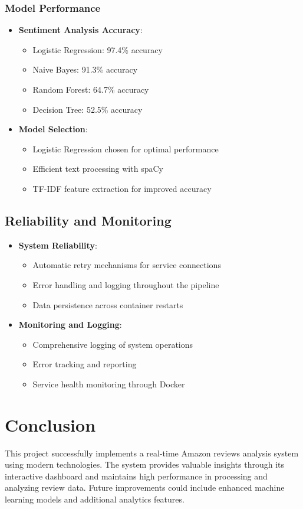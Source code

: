 \documentclass[11pt,a4paper,twocolumn]{article}
\begin{document}
\subsubsection{Model Performance}
\begin{itemize}
    \item \textbf{Sentiment Analysis Accuracy}:
    \begin{itemize}
        \item Logistic Regression: 97.4\% accuracy
        \item Naive Bayes: 91.3\% accuracy
        \item Random Forest: 64.7\% accuracy
        \item Decision Tree: 52.5\% accuracy
    \end{itemize}
    
    \item \textbf{Model Selection}:
    \begin{itemize}
        \item Logistic Regression chosen for optimal performance
        \item Efficient text processing with spaCy
        \item TF-IDF feature extraction for improved accuracy
    \end{itemize}
\end{itemize}

\subsection{Reliability and Monitoring}
\begin{itemize}
    \item \textbf{System Reliability}:
    \begin{itemize}
        \item Automatic retry mechanisms for service connections
        \item Error handling and logging throughout the pipeline
        \item Data persistence across container restarts
    \end{itemize}
    
    \item \textbf{Monitoring and Logging}:
    \begin{itemize}
        \item Comprehensive logging of system operations
        \item Error tracking and reporting
        \item Service health monitoring through Docker
    \end{itemize}
\end{itemize}

\section{Conclusion}
This project successfully implements a real-time Amazon reviews analysis system using modern technologies. The system provides valuable insights through its interactive dashboard and maintains high performance in processing and analyzing review data. Future improvements could include enhanced machine learning models and additional analytics features.
\end{document}
